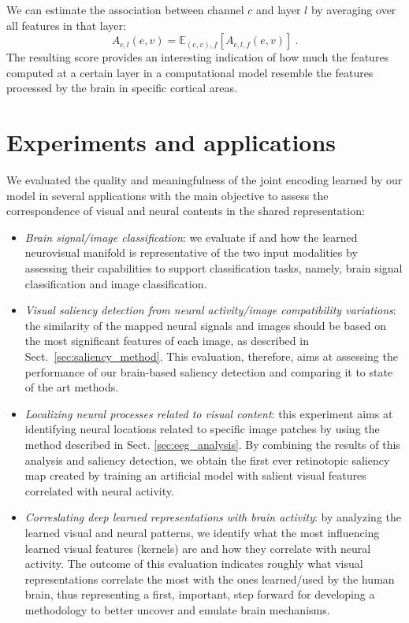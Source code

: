 \documentclass[10pt,journal,compsoc,twocolumn]{IEEEtran}
\begin{document}
We can estimate the association between channel $c$ and layer $l$ by averaging over all features in that layer:
\begin{equation}
A_{c,l}(e,v) = \mathbb{E}_{(e,v),f}\left[ A_{c,l,f}(e,v) \right]~.
\label{eq:assoc}
\end{equation}
The resulting score provides an interesting indication of how much the features computed at a certain layer in a computational model resemble the features processed by the brain in specific cortical areas.


\section{Experiments and applications}\label{sec:experiments}
We evaluated the quality and meaningfulness of the joint encoding learned by our model in several applications with the main objective to assess the correspondence of visual and neural contents in the shared representation:
\begin{itemize}
	\item \emph{Brain signal/image classification}: we evaluate if and how the learned neurovisual manifold is representative of the two input modalities by assessing their capabilities to support classification tasks, namely, brain signal classification and image classification. 
	\item \emph{Visual saliency detection from neural activity/image compatibility variations}: the similarity of the mapped neural signals and images should be based on the most significant features of each image, as described in Sect.~\ref{sec:saliency_method}. This evaluation, therefore, aims at assessing the performance of our brain-based saliency detection and comparing it to state of the art methods.
	\item \emph{Localizing neural processes related to visual content}: this experiment aims at identifying neural locations related to specific image patches by using the method described in Sect. \ref{sec:eeg_analysis}. By combining the results of this analysis and saliency detection, we obtain the first ever retinotopic saliency map created by training an artificial model with salient visual features correlated with neural activity.
	\item \emph{Correslating deep learned representations with brain activity}: by analyzing the learned visual and neural patterns, we identify what the most influencing learned visual features (kernels) are and how they correlate with neural activity. The outcome of this evaluation indicates roughly what visual representations correlate the most with the ones learned/used by the human brain, thus representing a first, important, step forward for developing a methodology to better uncover and emulate brain mechanisms.
\end{itemize}
\end{document}
